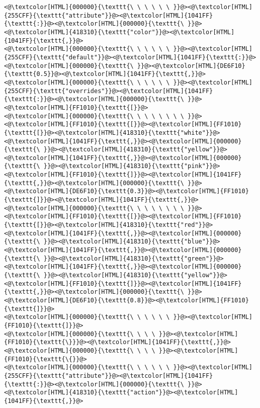 \begin{lstlisting}
<@\textcolor[HTML]{000000}{\texttt{\ \ \ \ \ \ }}@><@\textcolor[HTML]{255CFF}{\texttt{"attribute"}}@><@\textcolor[HTML]{1041FF}{\texttt{:}}@><@\textcolor[HTML]{000000}{\texttt{\ }}@><@\textcolor[HTML]{418310}{\texttt{"color"}}@><@\textcolor[HTML]{1041FF}{\texttt{,}}@>
<@\textcolor[HTML]{000000}{\texttt{\ \ \ \ \ \ }}@><@\textcolor[HTML]{255CFF}{\texttt{"default"}}@><@\textcolor[HTML]{1041FF}{\texttt{:}}@><@\textcolor[HTML]{000000}{\texttt{\ }}@><@\textcolor[HTML]{DE6F10}{\texttt{0.5}}@><@\textcolor[HTML]{1041FF}{\texttt{,}}@>
<@\textcolor[HTML]{000000}{\texttt{\ \ \ \ \ \ }}@><@\textcolor[HTML]{255CFF}{\texttt{"overrides"}}@><@\textcolor[HTML]{1041FF}{\texttt{:}}@><@\textcolor[HTML]{000000}{\texttt{\ }}@><@\textcolor[HTML]{FF1010}{\texttt{[}}@>
<@\textcolor[HTML]{000000}{\texttt{\ \ \ \ \ \ \ \ }}@><@\textcolor[HTML]{FF1010}{\texttt{[}}@><@\textcolor[HTML]{FF1010}{\texttt{[}}@><@\textcolor[HTML]{418310}{\texttt{"white"}}@><@\textcolor[HTML]{1041FF}{\texttt{,}}@><@\textcolor[HTML]{000000}{\texttt{\ }}@><@\textcolor[HTML]{418310}{\texttt{"yellow"}}@><@\textcolor[HTML]{1041FF}{\texttt{,}}@><@\textcolor[HTML]{000000}{\texttt{\ }}@><@\textcolor[HTML]{418310}{\texttt{"pink"}}@><@\textcolor[HTML]{FF1010}{\texttt{]}}@><@\textcolor[HTML]{1041FF}{\texttt{,}}@><@\textcolor[HTML]{000000}{\texttt{\ }}@><@\textcolor[HTML]{DE6F10}{\texttt{0.3}}@><@\textcolor[HTML]{FF1010}{\texttt{]}}@><@\textcolor[HTML]{1041FF}{\texttt{,}}@>
<@\textcolor[HTML]{000000}{\texttt{\ \ \ \ \ \ \ \ }}@><@\textcolor[HTML]{FF1010}{\texttt{[}}@><@\textcolor[HTML]{FF1010}{\texttt{[}}@><@\textcolor[HTML]{418310}{\texttt{"red"}}@><@\textcolor[HTML]{1041FF}{\texttt{,}}@><@\textcolor[HTML]{000000}{\texttt{\ }}@><@\textcolor[HTML]{418310}{\texttt{"blue"}}@><@\textcolor[HTML]{1041FF}{\texttt{,}}@><@\textcolor[HTML]{000000}{\texttt{\ }}@><@\textcolor[HTML]{418310}{\texttt{"green"}}@><@\textcolor[HTML]{1041FF}{\texttt{,}}@><@\textcolor[HTML]{000000}{\texttt{\ }}@><@\textcolor[HTML]{418310}{\texttt{"yellow"}}@><@\textcolor[HTML]{FF1010}{\texttt{]}}@><@\textcolor[HTML]{1041FF}{\texttt{,}}@><@\textcolor[HTML]{000000}{\texttt{\ }}@><@\textcolor[HTML]{DE6F10}{\texttt{0.8}}@><@\textcolor[HTML]{FF1010}{\texttt{]}}@>
<@\textcolor[HTML]{000000}{\texttt{\ \ \ \ \ \ }}@><@\textcolor[HTML]{FF1010}{\texttt{]}}@>
<@\textcolor[HTML]{000000}{\texttt{\ \ \ \ }}@><@\textcolor[HTML]{FF1010}{\texttt{\}}}@><@\textcolor[HTML]{1041FF}{\texttt{,}}@>
<@\textcolor[HTML]{000000}{\texttt{\ \ \ \ }}@><@\textcolor[HTML]{FF1010}{\texttt{\{}}@>
<@\textcolor[HTML]{000000}{\texttt{\ \ \ \ \ \ }}@><@\textcolor[HTML]{255CFF}{\texttt{"attribute"}}@><@\textcolor[HTML]{1041FF}{\texttt{:}}@><@\textcolor[HTML]{000000}{\texttt{\ }}@><@\textcolor[HTML]{418310}{\texttt{"action"}}@><@\textcolor[HTML]{1041FF}{\texttt{,}}@>

\end{lstlisting}
